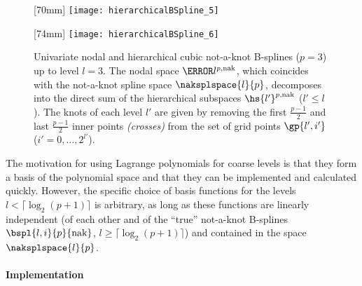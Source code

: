 \begin{figure}
  [70mm]{%
    \texttt{[image: hierarchicalBSpline\_5]}%
  }%
  \hfill%
  \hfill%
  [74mm]{%
    \texttt{[image: hierarchicalBSpline\_6]}%
  }%
  \caption[%
    Nodal and hierarchical not-a-knot B-splines%
  ]{%
    Univariate nodal and hierarchical cubic not-a-knot B-splines ($p = 3$)
    up to level $l = 3$.
    The nodal space $\ns{l}^{p,\nak}$,
    which coincides with the not-a-knot spline space $\naksplspace{l}{p}$,
    decomposes into the direct sum
    of the hierarchical subspaces $\hs{l'}^{p,\nak}$ ($l' \le l$).
    The knots of each level $l'$ are given by removing the
    first $\tfrac{p-1}{2}$ and last $\tfrac{p-1}{2}$
    inner points \emph{(crosses)}
    from the set of grid points $\gp{l',i'}$
    ($i' = 0, \dotsc, 2^{l'}$).%
  }%
  \label{fig:notAKnotBSpline}%
\end{figure}

The motivation for using Lagrange polynomials for coarse levels
is that they form a basis of the polynomial space
and that they can be implemented and calculated quickly.
However, the specific choice of basis functions for the levels
$l < \lceil\log_2(p + 1)\rceil$ is arbitrary,
as long as these functions are linearly independent
(of each other and of the ``true'' not-a-knot B-splines
$\bspl{l,i}{p}{\nak}$, $l \ge \lceil\log_2(p+1)\rceil$)
and contained in the space $\naksplspace{l}{p}$.

\paragraph{Implementation}

